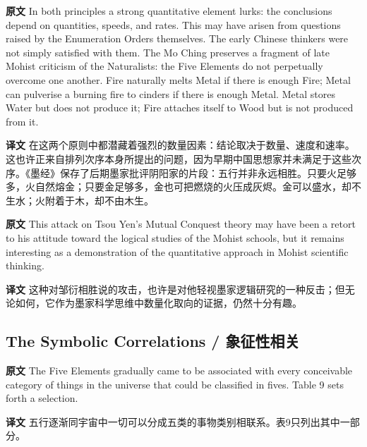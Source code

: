 \documentclass[UTF8,zihao=-4]{ctexart}
\newcommand{\BodyFont}{\fontsize{10.5pt}{15.5pt}\selectfont}
\newcommand{\origlabel}{\textbf{原文}\quad}
\newcommand{\translabel}{\textbf{译文}\quad}
\newenvironment{enblock}{\par\noindent\begingroup\BodyFont\origlabel}{\par\endgroup}
\newenvironment{zhblock}{\par\noindent\begingroup\BodyFont\translabel}{\par\endgroup\vspace{0.35em}}
\begin{document}
\begin{enblock}
In both principles a strong quantitative element lurks: the conclusions depend on quantities, speeds, and rates. This may have arisen from questions raised by the Enumeration Orders themselves. The early Chinese thinkers were not simply satisfied with them. The Mo Ching preserves a fragment of late Mohist criticism of the Naturalists: the Five Elements do not perpetually overcome one another. Fire naturally melts Metal if there is enough Fire; Metal can pulverise a burning fire to cinders if there is enough Metal. Metal stores Water but does not produce it; Fire attaches itself to Wood but is not produced from it.
\end{enblock}
\begin{zhblock}
在这两个原则中都潜藏着强烈的数量因素：结论取决于数量、速度和速率。这也许正来自排列次序本身所提出的问题，因为早期中国思想家并未满足于这些次序。《墨经》保存了后期墨家批评阴阳家的片段：五行并非永远相胜。只要火足够多，火自然熔金；只要金足够多，金也可把燃烧的火压成灰烬。金可以盛水，却不生水；火附着于木，却不由木生。
\end{zhblock}

\begin{enblock}
This attack on Tsou Yen's Mutual Conquest theory may have been a retort to his attitude toward the logical studies of the Mohist schools, but it remains interesting as a demonstration of the quantitative approach in Mohist scientific thinking.
\end{enblock}
\begin{zhblock}
这种对邹衍相胜说的攻击，也许是对他轻视墨家逻辑研究的一种反击；但无论如何，它作为墨家科学思维中数量化取向的证据，仍然十分有趣。
\end{zhblock}

\subsection*{The Symbolic Correlations / 象征性相关}

\begin{enblock}
The Five Elements gradually came to be associated with every conceivable category of things in the universe that could be classified in fives. Table 9 sets forth a selection.
\end{enblock}
\begin{zhblock}
五行逐渐同宇宙中一切可以分成五类的事物类别相联系。表9只列出其中一部分。
\end{zhblock}
\end{document}
